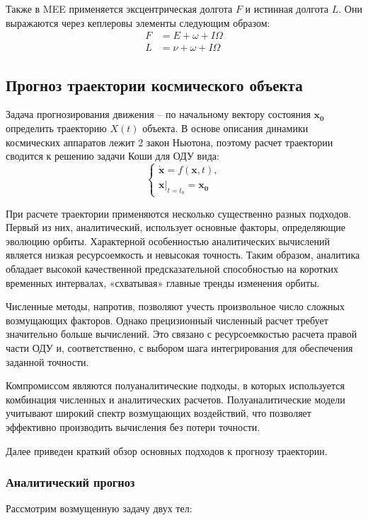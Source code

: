 Также в MEE применяется эксцентрическая долгота $F$ и истинная долгота $L$. 
Они выражаются через кеплеровы элементы следующим образом:
\begin{align*}
    F &= E + \omega + I \Omega \\
    L &= \nu + \omega + I \Omega
\end{align*}

\subsection{Прогноз траектории космического объекта}
Задача прогнозирования движения -- по начальному вектору состояния $\mathbf{x_0}$ определить траекторию $X(t)$ объекта.
В основе описания динамики космических аппаратов лежит 2 закон Ньютона, 
поэтому расчет траектории сводится к решению задачи Коши для ОДУ вида:
\begin{equation}
    \begin{cases}
        \dot{\mathbf{x}} = f(\mathbf{x}, t), \\
        \mathbf{x} \big|_{t = t_0} = \mathbf{x_0}
        \label{eq:prognoz_task}
    \end{cases}
\end{equation}

При расчете траектории применяются несколько существенно разных подходов. 
Первый из них, аналитический, использует основные факторы, определяющие эволюцию орбиты.
Характерной особенностью аналитических вычислений является низкая ресурсоемкость и невысокая точность.
Таким образом, аналитика обладает высокой качественной предсказательной способностью на коротких временных интервалах, 
«схватывая» главные тренды изменения орбиты.

Численные методы, напротив, позволяют учесть произвольное число сложных возмущающих факторов.
Однако прецизионный численный расчет требует значительно больше вычислений. 
Это связано с ресурсоемкостью расчета правой части ОДУ и,
соответственно, с выбором шага интегрирования для обеспечения заданной точности.

Компромиссом являются полуаналитические подходы, 
в которых используется комбинация численных и аналитических расчетов.
Полуаналитические модели учитывают широкий спектр возмущающих воздействий, 
что позволяет эффективно производить вычисления без потери точности.

Далее приведен краткий обзор основных подходов к прогнозу траектории.

\subsubsection{Аналитический прогноз}
Рассмотрим возмущенную задачу двух тел:

